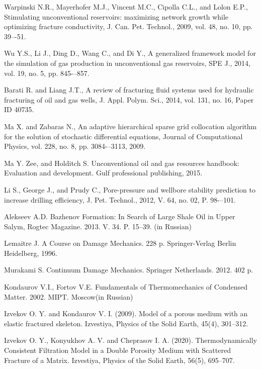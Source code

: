 \documentclass[article,authoryear,jpm]{beg_39}             %
\begin{document}
\begin{thebibliography}{-8}

\small{
Warpinski N.R., Mayerhofer M.J., Vincent M.C., Cipolla C.L., and Lolon E.P., Stimulating unconventional reservoirs: maximizing network growth while optimizing fracture conductivity, J. Can. Pet. Technol., 2009, vol. 48, no. 10, pp. 39–-51.

Wu Y.S., Li J., Ding D., Wang C., and Di Y., A generalized framework model for the simulation of gas production in unconventional gas reservoirs, SPE J., 2014, vol. 19, no. 5, pp. 845-–857.

Barati R. and Liang J.T., A review of fracturing fluid systems used for hydraulic fracturing of oil and gas wells, J. Appl. Polym. Sci., 2014, vol. 131, no. 16, Paper ID 40735.
    
Ma X. and Zabaras N., An adaptive hierarchical sparse grid collocation algorithm for the solution of stochastic differential equations, Journal of Computational Physics, vol. 228, no. 8, pp. 3084-–3113, 2009.

Ma Y. Zee, and Holditch S. Unconventional oil and gas resources handbook: Evaluation and development. Gulf professional publishing, 2015.

Li S., George J., and Prudy C., Pore-pressure and wellbore stability prediction to increase drilling efficiency, J. Pet. Technol., 2012, V. 64, no. 02, P. 98-–101.

Alekseev A.D. Bazhenov Formation: In Search of Large Shale Oil in Upper Salym, Rogtec Magazine. 2013. V. 34. P. 15--39. (in Russian)

Lemaitre J. A Course on Damage Mechanics. 228 p. Springer-Verlag Berlin Heidelberg, 1996.

Murakami S. Continuum Damage Mechanics. Springer Netherlands. 2012.  402 p.

Kondaurov V.I., Fortov V.E. Fundamentals of Thermomechanics of Condensed Matter. 2002. MIPT. Moscow(in Russian)

Izvekov O. Y. and Kondaurov V. I. (2009). Model of a porous medium with an elastic fractured skeleton. Izvestiya, Physics of the Solid Earth, 45(4), 301--312.

Izvekov O. Y., Konyukhov A. V. and Cheprasov I. A. (2020). Thermodynamically Consistent Filtration Model in a Double Porosity Medium with Scattered Fracture of a Matrix. Izvestiya, Physics of the Solid Earth, 56(5), 695--707.
    
}
\end{thebibliography}
\end{document}
